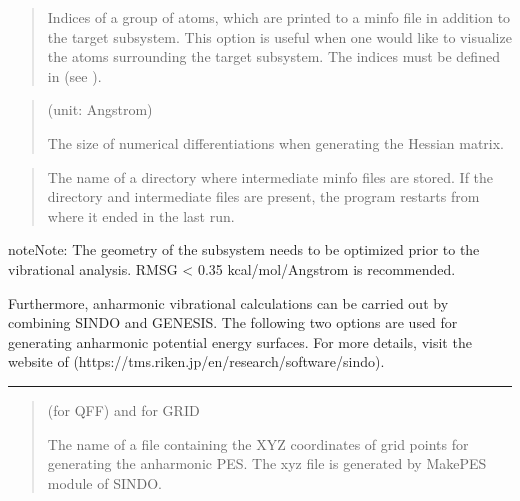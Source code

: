 \documentclass[a4paper,11pt,oneside,english]{sphinxmanual}
\begin{document}
 
\begin{quote}


Indices of a group of atoms, which are printed to a minfo file
in addition to the target subsystem. This option is useful
when one would like to visualize the atoms surrounding the
target subsystem.  The indices must be defined in
\sphinxstylestrong{{[}SELECTION{]}} (see {\hyperref[\detokenize{11_Selection:selection}]{}}).
\end{quote}

 
\begin{quote}

 (unit: Angstrom)

The size of numerical differentiations when generating the Hessian matrix.
\end{quote}

 
\begin{quote}


The name of a directory where intermediate minfo files are stored.
If the directory and intermediate files are present, the program restarts from
where it ended in the last run.
\end{quote}

\begin{sphinxadmonition}{note}{Note:}
The geometry of the subsystem needs to be optimized prior to the
vibrational analysis. RMSG \textless{} 0.35 kcal/mol/Angstrom is recommended.
\end{sphinxadmonition}

Furthermore, anharmonic vibrational calculations can be carried out by combining
SINDO and GENESIS. The following two options are used for generating anharmonic
potential energy surfaces. For more details, visit the website of
 (https://tms.riken.jp/en/research/software/sindo).


\bigskip\hrule\bigskip


 
\begin{quote}

 (for QFF) and  for GRID

The name of a file containing the XYZ coordinates of grid points for generating
the anharmonic PES. The xyz file is generated by MakePES module of SINDO.
\end{quote}
\end{document}
